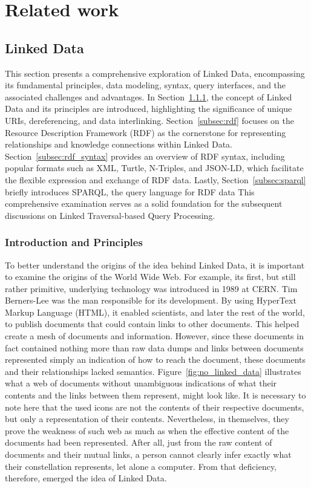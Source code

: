\chapter{Related work}
\label{chap:rel_work}

\section{Linked Data}

This section presents a comprehensive exploration of Linked Data, encompassing its fundamental principles, data modeling, syntax, query interfaces, and the associated challenges and advantages. In Section~\ref{subsec:introduction_principles}, the concept of Linked Data and its principles are introduced, highlighting the significance of unique URIs, dereferencing, and data interlinking. Section~\ref{subsec:rdf} focuses on the Resource Description Framework (RDF) as the cornerstone for representing relationships and knowledge connections within Linked Data. Section~\ref{subsec:rdf_syntax} provides an overview of RDF syntax, including popular formats such as XML, Turtle, N-Triples, and JSON-LD, which facilitate the flexible expression and exchange of RDF data. Lastly, Section~\ref{subsec:sparql} briefly introduces SPARQL, the query language for RDF data This comprehensive examination serves as a solid foundation for the subsequent discussions on Linked Traversal-based Query Processing.

\subsection{Introduction and Principles}
\label{subsec:introduction_principles}

To better understand the origins of the idea behind Linked Data, it is important to examine the origins of the World Wide Web. For example, its first, but still rather primitive, underlying technology was introduced in 1989 at CERN. Tim Berners-Lee was the man responsible for its development. By using HyperText Markup Language (HTML), it enabled scientists, and later the rest of the world, to publish documents that could contain links to other documents. This helped create a mesh of documents and information. However, since these documents in fact contained nothing more than raw data dumps and links between documents represented simply an indication of how to reach the document, these documents and their relationships lacked semantics. Figure~\ref{fig:no_linked_data} illustrates what a web of documents without unambiguous indications of what their contents and the links between them represent, might look like. It is necessary to note here that the used icons are not the contents of their respective documents, but only a representation of their contents. Nevertheless, in themselves, they prove the weakness of such web as much as when the effective content of the documents had been represented. After all, just from the raw content of documents and their mutual links, a person cannot clearly infer exactly what their constellation represents, let alone a computer. From that deficiency, therefore, emerged the idea of Linked Data. \citep{jacksi2019development} \citep{bizer2011linked}

